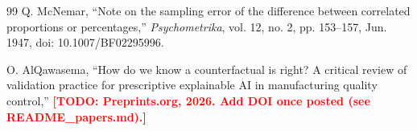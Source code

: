 \documentclass[11pt,a4paper]{article}
\newcommand{\TODO}[1]{\textcolor{red}{\textbf{[TODO: #1]}}}
\begin{document}
\begin{thebibliography}{99}
 Q. McNemar, ``Note on the sampling error of the difference between correlated proportions or percentages,'' \emph{Psychometrika}, vol. 12, no. 2, pp. 153--157, Jun. 1947, doi: 10.1007/BF02295996.

 O. AlQawasema, ``How do we know a counterfactual is right? A critical review of validation practice for prescriptive explainable AI in manufacturing quality control,'' \TODO{Preprints.org, 2026. Add DOI once posted (see README\_papers.md).}

\end{thebibliography}
\end{document}
